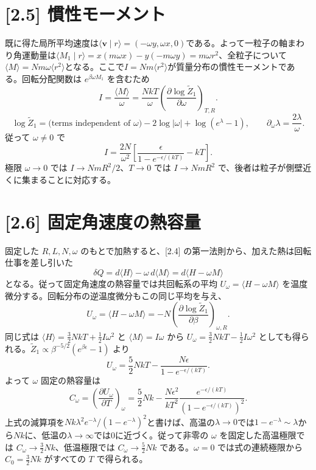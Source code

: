\documentclass[11pt,a4paper]{article}
\begin{document}
\section*{[2.5] 慣性モーメント}
既に得た局所平均速度は$\langle\boldsymbol v\mid r\rangle=(-\omega y,\omega x,0)$である。よって一粒子の軸まわり角運動量は$\langle M_1\mid r\rangle=x(m\omega x)-y(-m\omega y)=m\omega r^2$、全粒子について$\langle M\rangle=Nm\omega\langle r^2\rangle$となる。ここで$I=Nm\langle r^2\rangle$が質量分布の慣性モーメントである。回転分配関数は $e^{\beta\omega M_1}$ を含むため
\[
I=\frac{\langle M\rangle}{\omega}
=\frac{NkT}{\omega}\left(\frac{\partial\log\widetilde Z_1}{\partial\omega}\right)_{T,R}.
\]
\[
\log\widetilde Z_1=\text{(terms independent of $\omega$)}-2\log|\omega|+\log(e^\lambda-1),
\qquad \partial_\omega\lambda=\frac{2\lambda}{\omega}.
\]
従って $\omega\ne0$ で
\[
\boxed{I=\frac{2N}{\omega^2}\left[\frac{\epsilon}{1-e^{-\epsilon/(kT)}}-kT\right]}.
\]
極限 $\omega\to0$ では $I\to NmR^2/2$、$T\to0$ では $I\to NmR^2$ で、後者は粒子が側壁近くに集まることに対応する。

\section*{[2.6] 固定角速度の熱容量}
固定した $R,L,N,\omega$ のもとで加熱すると、[2.4] の第一法則から、加えた熱は回転仕事を差し引いた
\[
 \delta Q=d\langle H\rangle-\omega\,d\langle M\rangle
 =d\langle H-\omega M\rangle
\]
となる。従って固定角速度の熱容量では共回転系の平均 $U_\omega=\langle H-\omega M\rangle$ を温度微分する。回転分布の逆温度微分もこの同じ平均を与え、
\[
U_\omega=\langle H-\omega M\rangle=-N\left(\frac{\partial\log\widetilde Z_1}{\partial\beta}\right)_{\omega,R}.
\]
同じ式は $\langle H\rangle=\tfrac32NkT+\tfrac12I\omega^2$ と $\langle M\rangle=I\omega$ から $U_\omega=\tfrac32NkT-\tfrac12I\omega^2$ としても得られる。$\widetilde Z_1\propto\beta^{-5/2}(e^{\beta\epsilon}-1)$ より
\[
U_\omega=\frac52NkT-\frac{N\epsilon}{1-e^{-\epsilon/(kT)}}.
\]
よって $\omega$ 固定の熱容量は
\[
\boxed{C_\omega=\left(\frac{\partial U_\omega}{\partial T}\right)_\omega
=\frac52Nk-\frac{N\epsilon^2}{kT^2}\frac{e^{-\epsilon/(kT)}}{\left(1-e^{-\epsilon/(kT)}\right)^2}}.
\]
上式の減算項を$Nk\lambda^2e^{-\lambda}/(1-e^{-\lambda})^2$と書けば、高温の$\lambda\to0$では$1-e^{-\lambda}\sim\lambda$から$Nk$に、低温の$\lambda\to\infty$では0に近づく。従って非零の $\omega$ を固定した高温極限では $C_\omega\to\tfrac32Nk$、低温極限では $C_\omega\to\tfrac52Nk$ である。$\omega=0$ では式の連続極限から $C_0=\tfrac32Nk$ がすべての $T$ で得られる。
\end{document}
